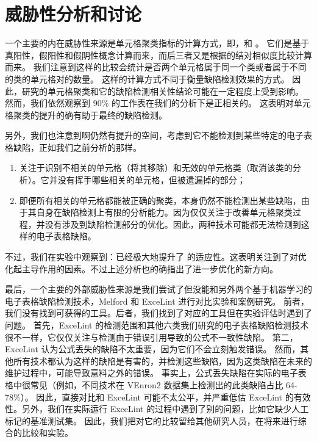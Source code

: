 \section{威胁性分析和讨论}

一个主要的内在威胁性来源是单元格聚类指标的计算方式，即\prc ，\rec 和 \fmc 。
它们是基于真阳性，假阳性和假阴性概念计算而来，而后三者又是根据\cu 的结对相似度比较计算而来。
我们注意到这样的比较会统计是否两个单元格属于同一个类或者属于不同的类的单元格对的数量。
这样的计算方式不同于衡量缺陷检测效果的方式。
因此，研究\wa 的单元格聚类和它的缺陷检测相关性结论可能在一定程度上受到影响。
然而，我们依然观察到 90\% 的工作表在我们的分析下是正相关的。
这表明\wa 对单元格聚类的提升的确有助于最终的缺陷检测。

另外，我们也注意到\wa 啊仍然有提升的空间，考虑到它不能检测到某些特定的电子表格缺陷，正如我们之前分析的那样。
\begin{enumerate}
    \item \wa 关注于识别不相关的单元格（将其移除）和无效的单元格类（取消该类的分析）。它并没有挥手哪些相关的单元格，但被\cu 遗漏掉的部分；
    \item 即便所有相关的单元格都能被正确的聚类，\cu 本身仍然不能检测出某些缺陷，由于其自身在缺陷检测上有限的分析能力。因为\wa 仅仅关注于改善单元格聚类过程，并没有涉及到缺陷检测部分的优化。因此，两种技术可能都无法检测到这样的电子表格缺陷。
\end{enumerate}
不过，我们在实验中观察到：\wa 已经极大地提升了 \cu 的适应性。这表明\wa 关注到了对优化起主导作用的因素。不过上述分析也的确指出了进一步优化的新方向。

最后，一个主要的外部威胁性来源是我们尝试了但没能和另外两个基于机器学习的电子表格缺陷检测技术，Melford\cite{singh2017melford} 和 ExceLint\cite{Barowy2018excelint} 进行对比实验和案例研究。
前者，我们没有找到可获得的工具。后者，我们找到了对应的工具但在实验评估时遇到了问题。
首先，ExceLint 的检测范围和其他六类我们研究的电子表格缺陷检测技术很不一样，它仅仅关注与检测由于错误引用导致的公式不一致性缺陷。
第二，ExceLint 认为公式丢失的缺陷不太重要，因为它们不会立刻触发错误。
然而，其他所有技术都认为这样的缺陷是有害的，并检测这些缺陷，因为这类缺陷在未来的维护过程中，可能导致意料之外的错误。
事实上，公式丢失缺陷在实际的电子表格中很常见（例如，不同技术在 VEnron2 数据集上检测出的此类缺陷占比 64-78\%）。
因此，直接对比\wa 和 ExceLint 可能不太公平，并严重低估 ExceLint 的有效性。另外，我们在实际运行 ExceLint 的过程中遇到了别的问题，比如它缺少人工标记的基准测试集。
因此，我们把对它的比较留给其他研究人员，在将来进行综合的比较和实验。